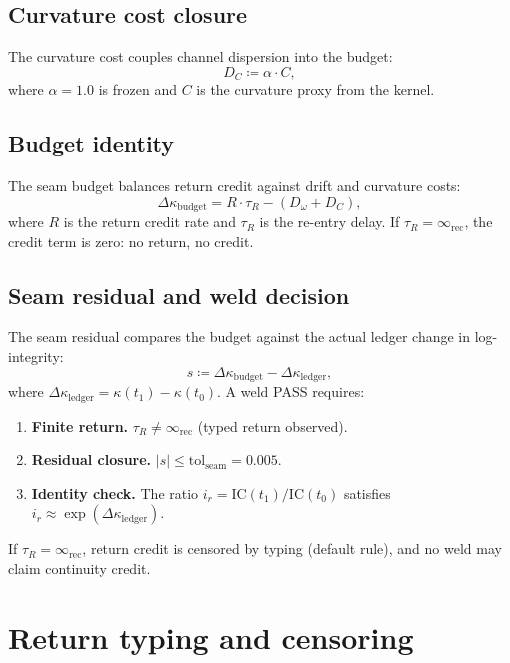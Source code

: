\documentclass[
  aps,
  prd,
  preprint,
  superscriptaddress,
  nofootinbib,
  floatfix
]{revtex4-2}
\newcommand{\Rinf}{\infty_{\mathrm{rec}}}
\newcommand{\IC}{\mathrm{IC}}
\begin{document}
\subsection{Curvature cost closure}
The curvature cost couples channel dispersion into the budget:
\begin{equation}
  D_C \coloneqq \alpha \cdot C,
\end{equation}
where $\alpha=1.0$ is frozen and $C$ is the curvature proxy from the kernel.

\subsection{Budget identity}
The seam budget balances return credit against drift and curvature costs:
\begin{equation}
  \Delta\kappa_{\mathrm{budget}} = R\cdot\tau_R - (D_\omega + D_C),
\end{equation}
where $R$ is the return credit rate and $\tau_R$ is the re-entry delay.
If $\tau_R = \Rinf$, the credit term is zero: no return, no credit.

\subsection{Seam residual and weld decision}
The seam residual compares the budget against the actual ledger change in log-integrity:
\begin{equation}
  s \coloneqq \Delta\kappa_{\mathrm{budget}} - \Delta\kappa_{\mathrm{ledger}},
\end{equation}
where $\Delta\kappa_{\mathrm{ledger}} = \kappa(t_1) - \kappa(t_0)$.
A weld \textsc{PASS} requires:
\begin{enumerate}[leftmargin=2.2em]
  \item \textbf{Finite return.} $\tau_R \neq \Rinf$ (typed return observed).
  \item \textbf{Residual closure.} $|s| \le \mathrm{tol}_{\mathrm{seam}} = 0.005$.
  \item \textbf{Identity check.} The ratio $i_r = \IC(t_1)/\IC(t_0)$ satisfies $i_r \approx \exp(\Delta\kappa_{\mathrm{ledger}})$.
\end{enumerate}
If $\tau_R=\Rinf$, return credit is censored by typing (default rule), and no weld may claim continuity credit.

\section{Return typing and censoring}
\label{sec:return}
\end{document}
